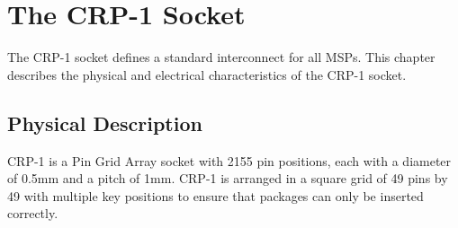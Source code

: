 \documentclass[12pt]{report}
\begin{document}
\newpage



\chapter{The CRP-1 Socket}
\large
The CRP-1 socket defines a standard interconnect for all MSPs. This chapter describes the physical and electrical
characteristics of the CRP-1 socket.
\normalsize
\newpage
\section{Physical Description}
CRP-1 is a Pin Grid Array socket with 2155 pin positions, each with a diameter of 0.5mm and a pitch of 1mm. CRP-1 is arranged
in a square grid of 49 pins by 49 with multiple key positions to ensure that packages can only be inserted correctly. 
\end{document}
